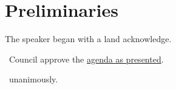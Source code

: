 \section*{Preliminaries}

\begin{information}

    The speaker began with a land acknowledge. 

\end{information}

\begin{motion}
    \birt\ Council approve the \hyperref[agenda]{agenda as presented}.
    \movers{\seneca}{\nickta}

    \carries\ unanimously.
\end{motion}

